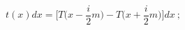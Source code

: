 \begin{equation}
t(x)dx=\Big[T\Big(x-\frac{i}{2}m\Big)- T\Big(x+\frac{i}{2}m\Big)\Big]dx\ ;
\label{t}
\end{equation}

